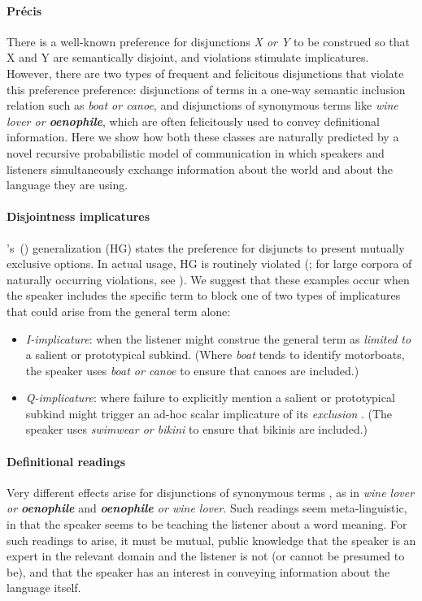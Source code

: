 \documentclass[12pt]{article}
\newcommand{\word}[1]{\emph{#1}}
\newcommand{\tech}[1]{\emph{#1}}
\newcommand{\posscitet}[1]{\citeauthor{#1}'s~(\citeyear{#1})}
\begin{document}
\paragraph{Pr{\'e}cis}
There is a well-known preference for disjunctions \word{X or Y} to be
construed so that X and Y are semantically disjoint, and violations
stimulate implicatures.  However, there are two types of frequent and
felicitous disjunctions that violate this preference preference:
disjunctions of terms in a one-way semantic inclusion relation such as
\word{boat or canoe}, and disjunctions of synonymous terms like
\word{wine lover or \textbf{oenophile}}, which are often felicitously
used to convey definitional information.  Here we show how both these
classes are naturally predicted by a novel recursive probabilistic
model of communication in which speakers and listeners simultaneously
exchange information about the world and about the language they are
using.

\paragraph{Disjointness implicatures}
\posscitet{Hurford:1974} generalization (HG) states the preference for
disjuncts to present mutually exclusive options. In actual usage, HG
is routinely violated (\citealt{Rohdenburg:1985}; for large corpora of
naturally occurring violations, see
\citealt{Potts13MICH,Chemla-HurfordCounts}).  We suggest that these
examples occur when the speaker includes the specific term to block
one of two types of implicatures that could arise from the general
term alone:

\begin{itemize}
\item \tech{I-implicature}: when the listener might 
  construe the general term as \emph{limited to} a salient or prototypical
  subkind. (Where \word{boat} tends to identify motorboats, the
  speaker uses \emph{boat or canoe} to ensure that
  canoes are included.)

\item \tech{Q-implicature}: where failure to explicitly mention a
  salient or prototypical subkind might trigger an ad-hoc scalar
  implicature of its \emph{exclusion} \citep{hirschberg:1985}. (The
  speaker uses \emph{swimwear or bikini} to ensure that bikinis are included.)
\end{itemize}

\paragraph{Definitional readings} Very different effects arise for
disjunctions of synonymous terms \citep{Horn89,Rohdenburg:1985}, as in
\word{wine lover or \textbf{oenophile}} and \word{\textbf{oenophile}
  or wine lover}. Such readings seem meta-linguistic, in that the
speaker seems to be teaching the listener about a word meaning. For
such readings to arise, it must be mutual, public knowledge that the
speaker is an expert in the relevant domain and the listener is not
(or cannot be presumed to be), and that the speaker has an interest in
conveying information about the language itself.
\end{document}
